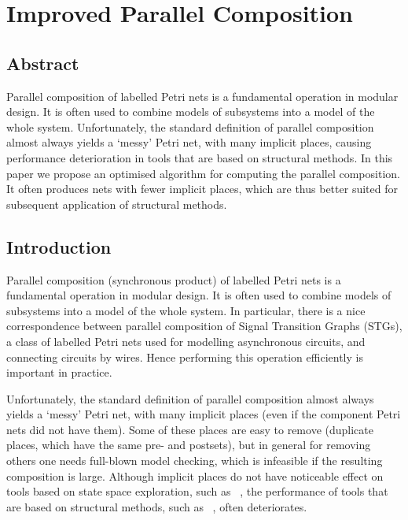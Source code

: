 \section{Improved Parallel Composition}\label{sec_intro}



\subsection{Abstract}
Parallel composition of labelled Petri nets is a fundamental operation in modular design. It is often used to combine models of subsystems into a model of the whole system.
Unfortunately, the standard definition of parallel composition almost always yields a `messy' Petri net, with many implicit places, causing performance deterioration in tools that are based on structural methods. In this paper we propose an optimised algorithm for computing the parallel composition. It often produces nets with fewer implicit places, which are thus better suited for subsequent application of structural methods.

\subsection{Introduction}

Parallel composition (\aka synchronous product) of labelled
Petri nets is a fundamental operation in modular design. It is
often used to combine models of subsystems into a model of the
whole system. In particular, there is a nice correspondence
between parallel composition of Signal Transition Graphs
(STGs), a class of labelled Petri nets used for modelling
asynchronous circuits, and connecting circuits by wires. Hence
performing this operation efficiently is important in practice.

Unfortunately, the standard definition of parallel composition almost always yields a `messy' Petri net, with many implicit places (even if the component Petri nets did not have them). Some of these places are easy to remove (\eg duplicate places, which have the same pre- and postsets), but in general for removing others one needs full-blown model checking, which is infeasible if the resulting composition is large.
Although implicit places do not have noticeable effect on tools based on state space exploration, such as \petrify~\cite{ckkly97}, the performance of tools that are based on structural methods, such as \desij~\cite{Sch07}, often deteriorates.


